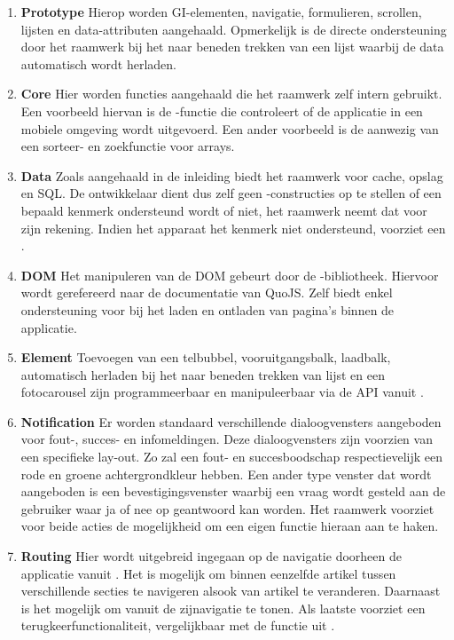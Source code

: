 \begin{enumerate}

\item \textbf{Prototype } 
Hierop worden GI-elementen, navigatie, formulieren, scrollen, lijsten en data-attributen aangehaald. 
Opmerkelijk is de directe ondersteuning door het raamwerk bij het naar beneden trekken van een lijst waarbij de data automatisch wordt herladen.

\item \textbf{Core }
Hier worden functies aangehaald die het raamwerk zelf intern gebruikt.
Een voorbeeld hiervan is de -functie die controleert of de applicatie in een mobiele omgeving wordt uitgevoerd.
Een ander voorbeeld is de aanwezig van een sorteer- en zoekfunctie voor arrays.

\item \textbf{Data }
Zoals aangehaald in de inleiding biedt het raamwerk  voor cache, opslag en SQL.
De ontwikkelaar dient dus zelf geen -constructies op te stellen of een bepaald kenmerk ondersteund wordt of niet, het raamwerk neemt dat voor zijn rekening.
Indien het apparaat het kenmerk niet ondersteund, voorziet \lungo{} een .

\item \textbf{DOM }
Het manipuleren van de DOM gebeurt door de \quo{}-bibliotheek.
Hiervoor wordt gerefereerd naar de documentatie van QuoJS.
Zelf biedt \lungo{} enkel ondersteuning voor  bij het laden en ontladen van pagina's binnen de applicatie.

\item \textbf{Element }
Toevoegen van een telbubbel, vooruitgangsbalk, laadbalk, automatisch herladen bij het naar beneden trekken van lijst en een fotocarousel zijn programmeerbaar en manipuleerbaar via de \lungo{} API vanuit \js{}. 

\item \textbf{Notification }
Er worden standaard verschillende dialoogvensters aangeboden voor fout-, succes- en infomeldingen.
Deze dialoogvensters zijn voorzien van een specifieke lay-out.
Zo zal een fout- en succesboodschap respectievelijk een rode en groene achtergrondkleur hebben.
Een ander type venster dat wordt aangeboden is een bevestigingsvenster waarbij een vraag wordt gesteld aan de gebruiker waar ja of nee op geantwoord kan worden.
Het raamwerk voorziet voor beide acties de mogelijkheid om een eigen functie hieraan aan te haken.
 
\item \textbf{Routing }
Hier wordt uitgebreid ingegaan op de navigatie doorheen de applicatie vanuit \js{}.
Het is mogelijk om binnen eenzelfde artikel tussen verschillende secties te navigeren alsook van artikel te veranderen.
Daarnaast is het mogelijk om vanuit \js{} de zijnavigatie te tonen.
Als laatste voorziet \lungo{} een terugkeerfunctionaliteit, vergelijkbaar met de functie  uit \js{}.


\end{enumerate}

